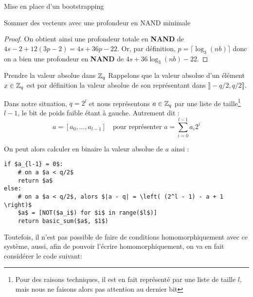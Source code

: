 \begin{section}{Mise en place d'un bootstrapping}
\begin{subsection}{Sommer des vecteurs avec une profondeur en NAND minimale}
\begin{proof}

	On obtient ainsi une profondeur totale en \textbf{NAND} de $4 s - 2 + 12(3p - 2) = 4s + 36p -22$. Or, par définition, $p = \lceil \log_3(nb) \rceil$ donc on a bien une profondeur en \textbf{NAND} de $4s + 36\log_3(nb) -22$.
\end{proof}

\end{subsection}
\begin{subsection}{Prendre la valeur absolue dans $\mathbb{Z}_q$}
	Rappelons que la valeur absolue d'un élément $x\in \mathbb{Z}_q$ est par définition la valeur absolue de son représentant dans $\rrbracket -q/2, q/2\rrbracket$. 
	
	Dans notre situation, $q = 2^l$ et nous représentons $a\in \mathbb{Z}_q$ par une liste de taille\footnote{Pour des raisons techniques, il est en fait représenté par une liste de taille $l$, mais nous ne faisons alors pas attention au dernier bit} $l-1$, le bit de poids faible étant à gauche. Autrement dit :
\[ a = [a_0, ..., a_{l-1}] \quad \text{pour représenter } a = \sum_{i=0}^{l-1} a_i 2^i\]

	On peut alors calculer en binaire la valeur absolue de $a$ ainsi :

\vspace{0.5cm}
\begin{lstlisting}
if $a_{l-1} = 0$: 
	# on a $a < q/2$
	return $a$
else:
	# on a $a < q/2$, alors $|a - q| = \left( (2^l - 1) - a + 1 \right)$
	$a$ = [NOT($a_i$) for $i$ in range($l$)]
	return basic_sum($a$, $1$)
\end{lstlisting}

	Toutefois, il n'est pas possible de faire de conditions homomorphiquement avec ce système, aussi, afin de pouvoir l'écrire homomorphiquement, on va en fait considérer le code suivant:


\end{subsection}
\end{section}
